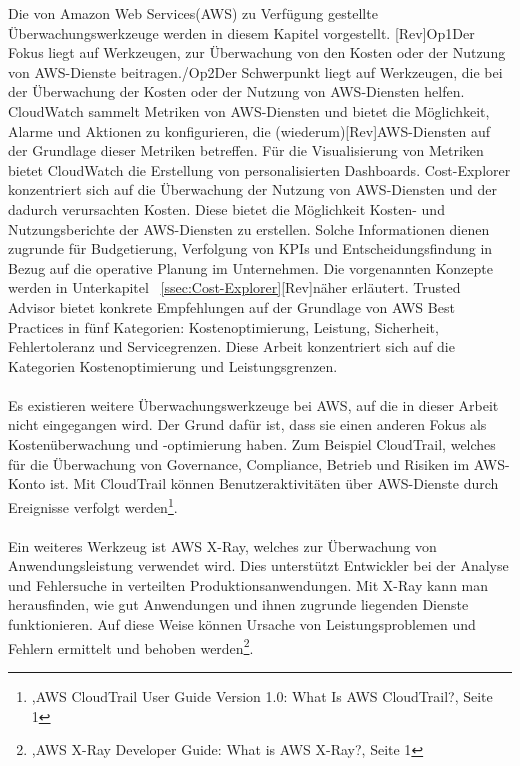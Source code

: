 Die von Amazon Web Services(AWS) zu Verfügung gestellte Überwachungswerkzeuge werden in diesem Kapitel vorgestellt. [Rev]Op1{Der Fokus liegt auf Werkzeugen, zur Überwachung von den Kosten oder der Nutzung von AWS-Dienste beitragen.}/Op2{Der Schwerpunkt liegt auf Werkzeugen, die bei der Überwachung der Kosten oder der Nutzung von AWS-Diensten helfen.}
CloudWatch sammelt Metriken von AWS-Diensten und bietet die Möglichkeit, Alarme und Aktionen zu konfigurieren, die (wiederum)[Rev]AWS-Diensten auf der Grundlage dieser Metriken betreffen. Für die Visualisierung von Metriken bietet CloudWatch die Erstellung von personalisierten Dashboards.
Cost-Explorer konzentriert sich auf die Überwachung der Nutzung von AWS-Diensten und der dadurch verursachten Kosten. Diese bietet die Möglichkeit Kosten- und Nutzungsberichte der AWS-Diensten zu erstellen. Solche Informationen dienen zugrunde für Budgetierung, %
Verfolgung von KPIs und Entscheidungsfindung in Bezug auf die operative Planung im Unternehmen. Die vorgenannten Konzepte werden in Unterkapitel ~\ref{ssec:Cost-Explorer}[Rev]näher erläutert. %
Trusted Advisor bietet konkrete Empfehlungen auf der Grundlage von AWS Best Practices in fünf Kategorien: Kostenoptimierung, Leistung, Sicherheit, Fehlertoleranz und Servicegrenzen. Diese Arbeit konzentriert sich auf die Kategorien Kostenoptimierung und Leistungsgrenzen. 
\\\\
Es existieren weitere Überwachungswerkzeuge bei AWS, auf die in dieser Arbeit nicht eingegangen wird. Der Grund dafür ist, dass sie einen anderen Fokus als Kostenüberwachung und -optimierung haben. Zum Beispiel CloudTrail, welches für die Überwachung von Governance, Compliance, Betrieb und Risiken im AWS-Konto ist. Mit CloudTrail können Benutzeraktivitäten über AWS-Dienste durch Ereignisse verfolgt werden\footnote{\cite{AMZ27},AWS CloudTrail User Guide Version 1.0: What Is AWS CloudTrail?, Seite 1}.
\\\\
Ein weiteres Werkzeug ist AWS X-Ray, welches zur Überwachung von Anwendungsleistung verwendet wird. Dies unterstützt Entwickler bei der Analyse und Fehlersuche in verteilten Produktionsanwendungen. Mit X-Ray kann man herausfinden, wie gut Anwendungen und ihnen zugrunde liegenden Dienste funktionieren. Auf diese Weise können Ursache von Leistungsproblemen und Fehlern ermittelt und behoben werden\footnote{\cite{AMZ27},AWS X-Ray Developer Guide: What is AWS X-Ray?, Seite 1}.
\newpage

